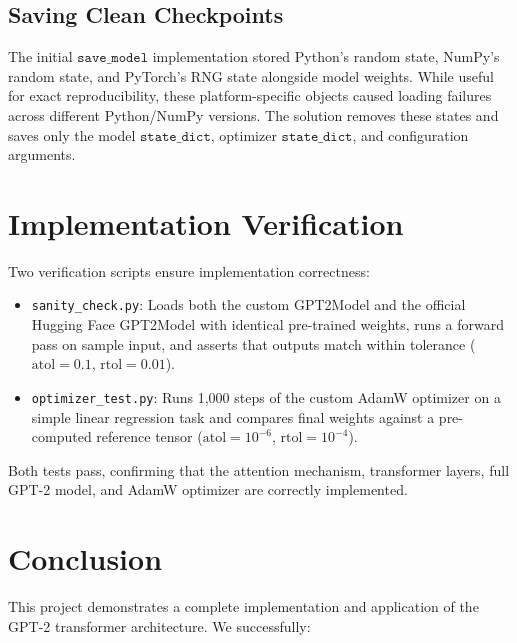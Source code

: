 \documentclass[11pt,a4paper]{article}
\begin{document}
\subsection{Saving Clean Checkpoints}

The initial $\texttt{save\_model}$ implementation stored Python's random state, NumPy's random state, and PyTorch's RNG state alongside model weights. While useful for exact reproducibility, these platform-specific objects caused loading failures across different Python/NumPy versions. The solution removes these states and saves only the model $\texttt{state\_dict}$, optimizer $\texttt{state\_dict}$, and configuration arguments.

\section{Implementation Verification}

Two verification scripts ensure implementation correctness:

\begin{itemize}[nosep]
  \item \texttt{sanity\_check.py}: Loads both the custom GPT2Model and the official Hugging Face GPT2Model with identical pre-trained weights, runs a forward pass on sample input, and asserts that outputs match within tolerance ($\text{atol}=0.1$, $\text{rtol}=0.01$).
  \item \texttt{optimizer\_test.py}: Runs 1,000 steps of the custom AdamW optimizer on a simple linear regression task and compares final weights against a pre-computed reference tensor ($\text{atol}=10^{-6}$, $\text{rtol}=10^{-4}$).
\end{itemize}

Both tests pass, confirming that the attention mechanism, transformer layers, full GPT-2 model, and AdamW optimizer are correctly implemented.

\section{Conclusion}

This project demonstrates a complete implementation and application of the GPT-2 transformer architecture. We successfully:
\end{document}
